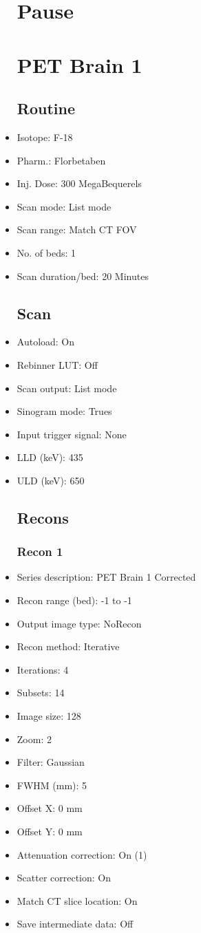 \documentclass[12pt]{article}
\begin{document}
\begin{itemize}[noitemsep]
\section{Pause}
\section{PET Brain 1}\subsection{Routine}
\item Isotope: F-18
\item Pharm.: Florbetaben
\item Inj. Dose: 300 MegaBequerels
\item Scan mode: List mode
\item Scan range: Match CT FOV
\item No. of beds: 1
\item Scan duration/bed: 20 Minutes
\subsection{Scan}
\item Autoload: On
\item Rebinner LUT: Off
\item Scan output: List mode
\item Sinogram mode: Trues
\item Input trigger signal: None
\item LLD (keV): 435
\item ULD (keV): 650
\subsection{Recons}
\subsubsection{Recon 1}
\item Series description: PET Brain 1 Corrected
\item Recon range (bed): -1 to -1
\item Output image type: NoRecon
\item Recon method: Iterative
\item Iterations: 4
\item Subsets: 14
\item Image size: 128
\item Zoom: 2
\item Filter: Gaussian
\item FWHM (mm): 5
\item Offset X: 0 mm
\item Offset Y: 0 mm
\item Attenuation correction: On (1)
\item Scatter correction: On
\item Match CT slice location: On
\item Save intermediate data: Off
\end{itemize}
\end{document}
